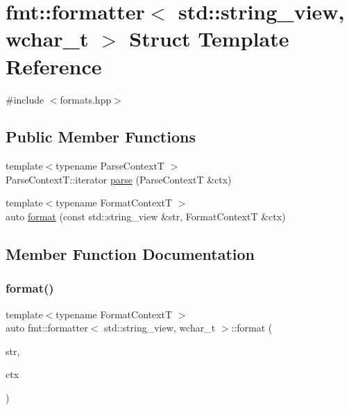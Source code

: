 \hypertarget{structfmt_1_1formatter_3_01std_1_1string__view_00_01wchar__t_01_4}{}\section{fmt\+:\+:formatter$<$ std\+:\+:string\+\_\+view, wchar\+\_\+t $>$ Struct Template Reference}
\label{structfmt_1_1formatter_3_01std_1_1string__view_00_01wchar__t_01_4}


{\ttfamily \#include $<$formats.\+hpp$>$}

\subsection*{Public Member Functions}
\begin{DoxyCompactItemize}
\item 
{\footnotesize template$<$typename Parse\+ContextT $>$ }\\Parse\+Context\+T\+::iterator \mbox{\hyperlink{structfmt_1_1formatter_3_01std_1_1string__view_00_01wchar__t_01_4_a0b5dbceebbd17650c45b19dde1c0d7bb}{parse}} (Parse\+ContextT \&ctx)
\item 
{\footnotesize template$<$typename Format\+ContextT $>$ }\\auto \mbox{\hyperlink{structfmt_1_1formatter_3_01std_1_1string__view_00_01wchar__t_01_4_ab99fa55563f9d469d7158bb5424db9a3}{format}} (const std\+::string\+\_\+view \&str, Format\+ContextT \&ctx)
\end{DoxyCompactItemize}


\subsection{Member Function Documentation}
\mbox{\label{structfmt_1_1formatter_3_01std_1_1string__view_00_01wchar__t_01_4_ab99fa55563f9d469d7158bb5424db9a3}} 
\subsubsection{\texorpdfstring{format()}{format()}}
{\footnotesize\ttfamily template$<$typename Format\+ContextT $>$ \\
auto fmt\+::formatter$<$ std\+::string\+\_\+view, wchar\+\_\+t $>$\+::format (\begin{DoxyParamCaption}\item[{const std\+::string\+\_\+view \&}]{str,  }\item[{Format\+ContextT \&}]{ctx }\end{DoxyParamCaption})}

